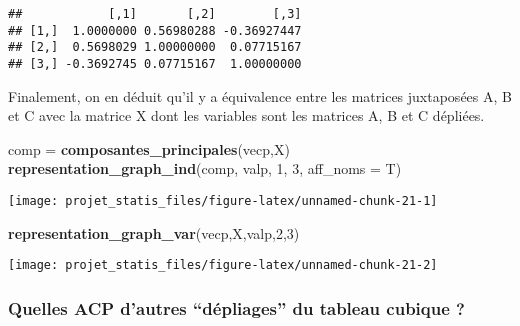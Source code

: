 \documentclass[
]{article}
\newenvironment{Shaded}{\begin{snugshade}}{\end{snugshade}}
\newcommand{\AttributeTok}[1]{\textcolor[rgb]{0.13,0.29,0.53}{#1}}
\newcommand{\CommentTok}[1]{\textcolor[rgb]{0.56,0.35,0.01}{\textit{#1}}}
\newcommand{\DecValTok}[1]{\textcolor[rgb]{0.00,0.00,0.81}{#1}}
\newcommand{\FunctionTok}[1]{\textcolor[rgb]{0.13,0.29,0.53}{\textbf{#1}}}
\newcommand{\NormalTok}[1]{#1}
\newcommand{\OtherTok}[1]{\textcolor[rgb]{0.56,0.35,0.01}{#1}}
\newcommand{\SpecialCharTok}[1]{\textcolor[rgb]{0.81,0.36,0.00}{\textbf{#1}}}
\begin{document}
\begin{verbatim}
##            [,1]       [,2]        [,3]
## [1,]  1.0000000 0.56980288 -0.36927447
## [2,]  0.5698029 1.00000000  0.07715167
## [3,] -0.3692745 0.07715167  1.00000000
\end{verbatim}

\begin{Shaded}
\end{Shaded}

Finalement, on en déduit qu'il y a équivalence entre les matrices
juxtaposées A, B et C avec la matrice X dont les variables sont les
matrices A, B et C dépliées.

\begin{Shaded}
\begin{Highlighting}[]
\NormalTok{comp }\OtherTok{=} \FunctionTok{composantes\_principales}\NormalTok{(vecp,X)}
\FunctionTok{representation\_graph\_ind}\NormalTok{(comp, valp, }\DecValTok{1}\NormalTok{, }\DecValTok{3}\NormalTok{, }\AttributeTok{aff\_noms =}\NormalTok{ T)}
\end{Highlighting}
\end{Shaded}

\begin{center}\texttt{[image: projet\_statis\_files/figure-latex/unnamed-chunk-21-1]} \end{center}

\begin{Shaded}
\begin{Highlighting}[]
\FunctionTok{representation\_graph\_var}\NormalTok{(vecp,X,valp,}\DecValTok{2}\NormalTok{,}\DecValTok{3}\NormalTok{)}
\end{Highlighting}
\end{Shaded}

\begin{center}\texttt{[image: projet\_statis\_files/figure-latex/unnamed-chunk-21-2]} \end{center}

\hypertarget{quelles-acp-dautres-duxe9pliages-du-tableau-cubique}{%
\subsubsection{Quelles ACP d'autres ``dépliages'' du tableau cubique
?}\label{quelles-acp-dautres-duxe9pliages-du-tableau-cubique}}
\end{document}
